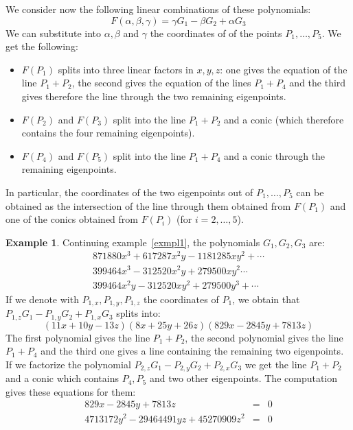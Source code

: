 \documentclass{amsart}
\theoremstyle{plain}
\theoremstyle{definition}
\newtheorem{example}[theorem]{Example}
\begin{document}
We consider now the following linear combinations of these polynomials:
\begin{equation}
F(\alpha, \beta, \gamma) = \gamma G_1 - \beta G_2 +\alpha G_3
\end{equation}
We can substitute into $\alpha, \beta$ and $\gamma$ the coordinates of
of the points $P_1, \dots, P_5$.
We get the following:
\begin{itemize}
\item $F(P_1)$ splits into three linear factors in $x, y, z$: one gives
  the equation of
  the line $P_1+P_2$, the second gives the equation of the lines $P_1+P_4$
  and the third gives therefore the line through the two remaining eigenpoints.
\item $F(P_2)$ and $F(P_3)$ split into the line $P_1+P_2$ and a conic
  (which therefore contains the four remaining eigenpoints).
\item $F(P_4)$ and $F(P_5)$ split into the line $P_1+P_4$ and a conic
  through the remaining eigenpoints.
\end{itemize}
In particular, the coordinates of the two eigenpoints out of
$P_1, \dots, P_5$ can be obtained as the intersection of the line through them
obtained from $F(P_1)$ and one of the conics obtained from $F(P_i)$ (for
$i= 2, \dots, 5$).  

\begin{example}
  Continuing example~\ref{exmpl1}, the polynomials $G_1, G_2, G_3$ are:
\[
  \begin{array}{l}
    871880x^3 + 617287 x^2y - 1181285xy^2 + \cdots\\
    399464x^3 - 312520x^2y + 279500xy^2 \cdots\\
    399464x^2y - 312520xy^2 + 279500y^3 +\cdots
  \end{array}
  \]
  If we denote with $P_{1,x}, P_{1,y}, P_{1,z}$ the coordinates of $P_1$, we
  obtain that $P_{1,z}G_1-P_{1,y}G_2+P_{1, x}G_3$ splits into:
  \[
    (11x + 10y - 13z) (8x + 25y + 26z) (829x - 2845y + 7813z) 
  \]
  The first polynomial gives the line $P_1+P_2$,
  the second polynomial gives the line $P_1+P_4$ and the third one gives a line
  containing the remaining two eigenpoints.
  If we factorize the polynomial $P_{2,z}G_1-P_{2,y}G_2+P_{2,x}G_3$ we get
  the line $P_1+P_2$ and a conic which contains $P_4, P_5$ and two other
  eigenpoints. The computation gives these equations for them:
  \begin{eqnarray*}
    829x - 2845y + 7813z & = & 0 \\
    4713172y^2 - 29464491yz + 45270909z^2 & = & 0
  \end{eqnarray*}
\end{example}
\end{document}
